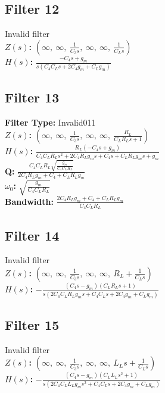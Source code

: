 \documentclass{article}
\begin{document}
\subsection*{Filter 12}
Invalid filter \\ 
\textbf{$Z(s)$:} $\left( \infty, \  \infty, \  \frac{1}{C_{3} s}, \  \infty, \  \infty, \  \frac{1}{C_{L} s}\right)$ \\ 
\textbf{$H(s)$:} $\frac{- C_{4} s + g_{m}}{s \left(C_{4} C_{L} s + 2 C_{4} g_{m} + C_{L} g_{m}\right)}$ \\ 
\subsection*{Filter 13}
\textbf{Filter Type:} Invalid011 \\ 
\textbf{$Z(s)$:} $\left( \infty, \  \infty, \  \frac{1}{C_{3} s}, \  \infty, \  \infty, \  \frac{R_{L}}{C_{L} R_{L} s + 1}\right)$ \\ 
\textbf{$H(s)$:} $\frac{R_{L} \left(- C_{4} s + g_{m}\right)}{C_{4} C_{L} R_{L} s^{2} + 2 C_{4} R_{L} g_{m} s + C_{4} s + C_{L} R_{L} g_{m} s + g_{m}}$ \\ 
\textbf{Q:} $\frac{C_{4} C_{L} R_{L} \sqrt{\frac{g_{m}}{C_{4} C_{L} R_{L}}}}{2 C_{4} R_{L} g_{m} + C_{4} + C_{L} R_{L} g_{m}}$ \\ 
\textbf{$\omega_0$:} $\sqrt{\frac{g_{m}}{C_{4} C_{L} R_{L}}}$ \\ 
\textbf{Bandwidth:} $\frac{2 C_{4} R_{L} g_{m} + C_{4} + C_{L} R_{L} g_{m}}{C_{4} C_{L} R_{L}}$ \\ 
\subsection*{Filter 14}
Invalid filter \\ 
\textbf{$Z(s)$:} $\left( \infty, \  \infty, \  \frac{1}{C_{3} s}, \  \infty, \  \infty, \  R_{L} + \frac{1}{C_{L} s}\right)$ \\ 
\textbf{$H(s)$:} $- \frac{\left(C_{4} s - g_{m}\right) \left(C_{L} R_{L} s + 1\right)}{s \left(2 C_{4} C_{L} R_{L} g_{m} s + C_{4} C_{L} s + 2 C_{4} g_{m} + C_{L} g_{m}\right)}$ \\ 
\subsection*{Filter 15}
Invalid filter \\ 
\textbf{$Z(s)$:} $\left( \infty, \  \infty, \  \frac{1}{C_{3} s}, \  \infty, \  \infty, \  L_{L} s + \frac{1}{C_{L} s}\right)$ \\ 
\textbf{$H(s)$:} $- \frac{\left(C_{4} s - g_{m}\right) \left(C_{L} L_{L} s^{2} + 1\right)}{s \left(2 C_{4} C_{L} L_{L} g_{m} s^{2} + C_{4} C_{L} s + 2 C_{4} g_{m} + C_{L} g_{m}\right)}$ \\ 
\end{document}
